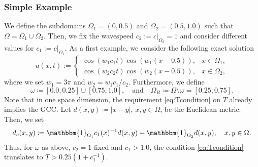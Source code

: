 \documentclass[sn-mathphys-num]{sn-jnl}
\numberwithin{equation}{section}
\begin{document}
\subsubsection{Simple Example}\label{sec:numex:1D:simple}
\noindent We define the subdomains $\Omega_1 = (0,0.5)$ and $\Omega_2 = (0.5,1.0)$ such that $\Omega = \overline{\Omega}_1 \cup \overline{\Omega}_2$. Then, we fix the wavespeed $c_2 := c \vert_{\Omega_2} = 1$ and consider different values for $c_1 := c \vert_{\Omega_1}$. As a first example, we consider the following exact solution \cite{MHI08}
\begin{equation}\label{eq:1D:exact:simple}
    u(x,t) := \begin{cases}
        \cos(w_1 c_1 t) \cos(w_1(x-0.5)), & x \in \Omega_1, \\
        \cos(w_2 c_2 t) \cos(w_2(x-0.5)), & x \in \Omega_2,
    \end{cases}
\end{equation}
where we set $w_1 = 3 \pi$ and $w_2 = w_1 c_1 / c_2$. Furthermore, we define
\begin{equation}
    \omega \coloneqq [0.0,0.25] \cup [0.75,1.0], \quad \text{and} \quad \Omega_R \coloneqq \Omega \setminus \omega = [0.25,0.75].
\end{equation}
Note that in one space dimension, the requirement \eqref{eq:Tcondition} on $T$ already implies the GCC. Let $d(x,y) \coloneqq \vert x - y \vert$, $x, y \in \Omega$, be the Euclidean metric. Then, we set
\begin{equation}
    d_c(x,y) \coloneqq \mathbbm{1}_{\Omega_1} c_1(x)^{-1} d(x,y) + \mathbbm{1}_{\Omega_2} d(x,y), \quad x,y \in \Omega.
\end{equation} 
Thus, for $\omega$ as above, $c_2 = 1$ fixed and $c_1 > 1.0$, the condition \eqref{eq:Tcondition} translates to $T > 0.25(1+c_1^{-1})$. 
\end{document}
